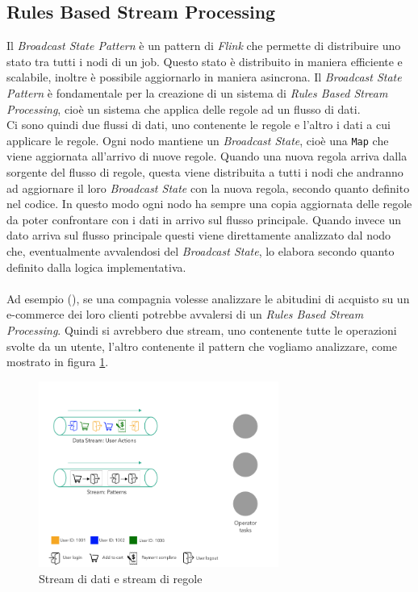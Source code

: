 \subsection{Rules Based Stream Processing}
\label{subsec:RulesBasedStreamProcessing}
Il \textit{Broadcast State Pattern} è un pattern di \textit{Flink} che permette di distribuire uno stato tra tutti i nodi di un job.
Questo stato è distribuito in maniera efficiente e scalabile, inoltre è possibile aggiornarlo in maniera asincrona.
Il \textit{Broadcast State Pattern} è fondamentale per la creazione di un sistema di \textit{Rules Based Stream Processing}, 
cioè un sistema che applica delle regole ad un flusso di dati.\\
Ci sono quindi due flussi di dati, uno contenente le regole e l'altro i dati a cui applicare le regole.
Ogni nodo mantiene un \textit{Broadcast State}, cioè una \texttt{Map} che viene aggiornata all'arrivo di nuove regole.
Quando una nuova regola arriva dalla sorgente del flusso di regole, questa viene distribuita a tutti i nodi che andranno ad aggiornare il loro \textit{Broadcast State}
con la nuova regola, secondo quanto definito nel codice. In questo modo ogni nodo ha sempre una copia aggiornata delle regole da poter confrontare con i dati in arrivo sul flusso principale.
Quando invece un dato arriva sul flusso principale questi viene direttamente analizzato dal nodo che, eventualmente avvalendosi del \textit{Broadcast State}, lo elabora 
secondo quanto definito dalla logica implementativa.\\\\
Ad esempio (), se una compagnia volesse analizzare le abitudini di acquisto su un e-commerce dei loro clienti 
potrebbe avvalersi di un \textit{Rules Based Stream Processing}. Quindi si avrebbero due stream, uno contenente tutte le operazioni svolte da un utente,
l'altro contenente il pattern che vogliamo analizzare, come mostrato in figura \ref{fig:broadcastState1}.
\begin{figure}[htpb]
    \centering
    \includegraphics[width=0.7\textwidth]{images/EventExport/broadcastState1.png}
    \caption{Stream di dati e stream di regole}
    \label{fig:broadcastState1}
\end{figure}
